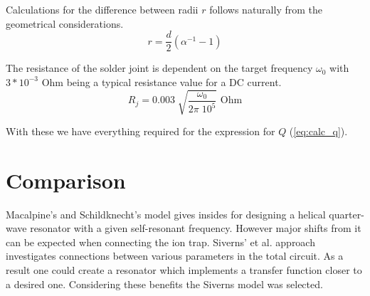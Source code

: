 Calculations for the difference between radii $r$ follows naturally from the geometrical considerations.
\begin{equation}
	r = \frac{d}{2} \left( \alpha^{-1} - 1 \right)
	\label{eq:calc_diff_r}
\end{equation}

The resistance of the solder joint is dependent on the target frequency $\omega_0$ with $3*10^{-3}$ Ohm being a typical resistance value for a DC current.
\begin{equation}
	R_j = 0.003 \; \sqrt{ \frac{\omega_0}{2\pi \; 10^5	} } \text{ Ohm}
	\label{eq:calc_R_j}
\end{equation}

With these we have everything required for the expression for $Q$ (\ref{eq:calc_q}).

\section{Comparison}
Macalpine's and Schildknecht's \cite{Macalpine2000} model gives insides for designing a helical quarter-wave resonator with a given self-resonant frequency. However major shifts from it can be expected when connecting the ion trap. Siverns' et al. approach \cite{Siverns2012} investigates connections between various parameters in the total circuit. As a result one could create a resonator which implements a transfer function closer to a desired one. Considering these benefits the Siverns model \cite{Siverns2012} was selected.